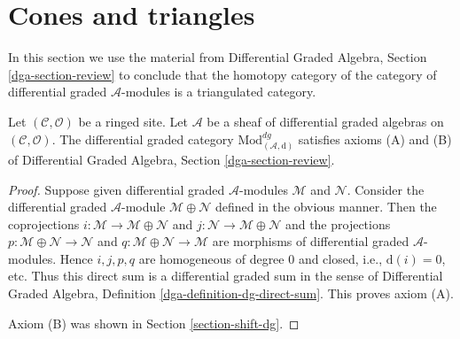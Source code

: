 \section{Cones and triangles}
\label{section-conclude-triangulated}

\noindent
In this section we use the material from
Differential Graded Algebra, Section \ref{dga-section-review}
to conclude that the homotopy category of the
category of differential graded $\mathcal{A}$-modules
is a triangulated category.

\begin{lemma}
\label{lemma-axioms-AB}
Let $(\mathcal{C}, \mathcal{O})$ be a ringed site.
Let $\mathcal{A}$ be a sheaf of differential graded algebras
on $(\mathcal{C}, \mathcal{O})$.
The differential graded category
$\text{Mod}^{dg}_{(\mathcal{A}, \text{d})}$
satisfies axioms (A) and (B) of
Differential Graded Algebra, Section \ref{dga-section-review}.
\end{lemma}

\begin{proof}
Suppose given differential graded $\mathcal{A}$-modules
$\mathcal{M}$ and $\mathcal{N}$. Consider the
differential graded $\mathcal{A}$-module $\mathcal{M} \oplus \mathcal{N}$
defined in the obvious manner. Then the coprojections
$i : \mathcal{M} \to \mathcal{M} \oplus \mathcal{N}$ and
$j : \mathcal{N} \to \mathcal{M} \oplus \mathcal{N}$ and the
projections
$p : \mathcal{M} \oplus \mathcal{N} \to \mathcal{N}$ and
$q : \mathcal{M} \oplus \mathcal{N} \to \mathcal{M}$
are morphisms of differential graded $\mathcal{A}$-modules.
Hence $i, j, p, q$ are homogeneous
of degree $0$ and closed, i.e., $\text{d}(i) = 0$, etc.
Thus this direct sum is a differential graded sum in the sense of
Differential Graded Algebra, Definition \ref{dga-definition-dg-direct-sum}.
This proves axiom (A).

\medskip\noindent
Axiom (B) was shown in Section \ref{section-shift-dg}.
\end{proof}

